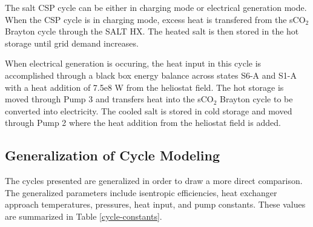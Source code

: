 \begin{paracol}{2}
\linenumbers
\switchcolumn

The salt CSP cycle can be either in charging mode or electrical generation mode. When the CSP cycle is in charging mode, excess heat is transfered from the sCO$_{2}$ Brayton cycle through the SALT HX. The heated salt is then stored in the hot storage until grid demand increases.   

When electrical generation is occuring, the heat input in this cycle is accomplished through a black box energy balance across states S6-A and S1-A with a heat addition of 7.5e8 W from the heliostat field. The hot storage is moved through Pump 3 and transfers heat into the sCO$_{2}$ Brayton cycle to be converted into electricity. The cooled salt is stored in cold storage and moved through Pump 2 where the heat addition from the heliostat field is added.



\subsection{Generalization of Cycle Modeling}

The cycles presented are generalized in order to draw a more direct comparison. The generalized parameters include isentropic efficiencies, heat exchanger approach temperatures, pressures, heat input, and pump constants. These values are summarized in Table \ref{cycle-constants}.



\end{paracol}
